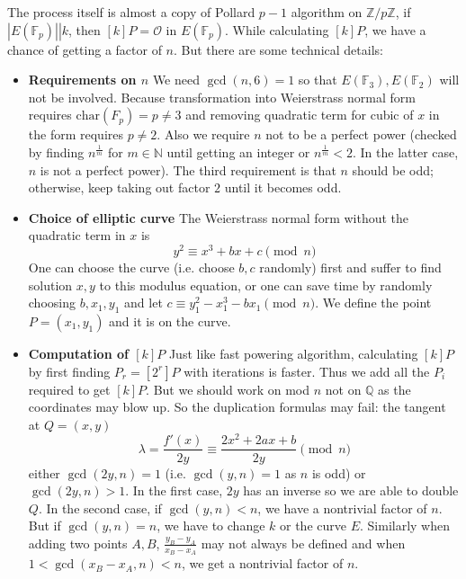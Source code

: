 \documentclass[12pt]{article}
\theoremstyle{remark}
\theoremstyle{definition}
\newcommand{\Z}[0]{\mathbb{Z}}
\newcommand{\F}[0]{\mathbb{F}}
\newcommand{\N}[0]{\mathbb{N}}
\newcommand{\Q}[0]{\mathbb{Q}}
\begin{document}
        The process itself is almost a copy of Pollard $p-1$ algorithm on $\Z/p\Z$, if $\left.|E(\F_p)| \right| k$, then $[k]P = \mathcal{O}$ in $E(\F_p)$. While calculating $[k]P$, we have a chance of getting a factor of $n$. But there are some technical details:
        \begin{itemize}
            \item \textbf{Requirements on $n$} We need $\gcd(n, 6) = 1$ so that $E(\F_3), E(\F_2)$ will not be involved. Because transformation into Weierstrass normal form requires $\text{char}(F_p) = p \neq 3$ and removing quadratic term for cubic of $x$ in the form requires $p \neq 2$. Also we require $n$ not to be a perfect power (checked by finding $n^{\frac{1}{m}}$ for $m \in \N$ until getting an integer or $n^{\frac{1}{m}} < 2$. In the latter case, $n$ is not a perfect power). The third requirement is that $n$ should be odd; otherwise, keep taking out factor $2$ until it becomes odd. 
            \item \textbf{Choice of elliptic curve} The Weierstrass normal form without the quadratic term in $x$ is
            $$y^2 \equiv x^3 + bx + c \pmod{n}$$ 
            One can choose the curve (i.e. choose $b, c$ randomly) first and suffer to find solution $x, y$ to this modulus equation, or one can save time by randomly choosing $b, x_1, y_1$ and let $c \equiv y_1^2 - x_1^3 - b x_1 \pmod{n}$. We define the point $P = (x_1, y_1)$ and it is on the curve. 
            \item \textbf{Computation of $[k]P$} Just like fast powering algorithm, calculating $[k]P$ by first finding $P_r = [2^r]P$ with iterations is faster. Thus we add all the $P_i$ required to get $[k]P$. But we should work on mod $n$ not on $\Q$ as the coordinates may blow up. So the duplication formulas may fail: the tangent at $Q = (x, y)$
            $$\lambda = \frac{f'(x)}{2y} \equiv \frac{2x^2 + 2ax + b}{2y} \pmod{n}$$
            either $\gcd(2y, n) = 1$ (i.e. $\gcd(y, n) = 1$ as $n$ is odd) or $\gcd(2y, n) > 1$. In the first case, $2y$ has an inverse so we are able to double $Q$. In the second case, if $\gcd(y, n) < n$, we have a nontrivial factor of $n$. But if $\gcd(y, n) = n$, we have to change $k$ or the curve $E$. Similarly when adding two points $A, B$, $\frac{y_B - y_A}{x_B - x_A}$ may not always be defined and when $1 < \gcd(x_B - x_A, n) < n$, we get a nontrivial factor of $n$.
        \end{itemize}
\end{document}
